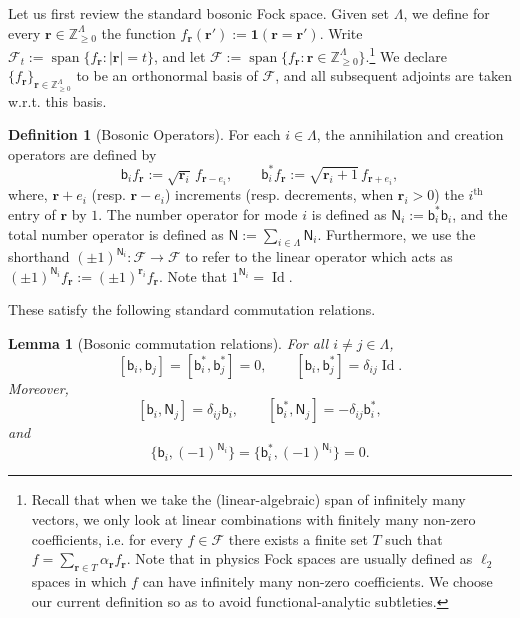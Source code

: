 \documentclass
[11pt,letterpaper]
{article}
\newtheorem{lemma}[theorem]{Lemma}
\theoremstyle{definition}
\newtheorem{definition}[theorem]{Definition}
\newcommand{\sfb}{\mathsf b}
\newcommand{\Num}{\mathsf N}
\newcommand{\cF}{{\mathcal F}}
\newcommand{\1}{\mathbf{1}}
\newcommand{\Z}{\mathbb Z}
\newcommand{\Id}{\operatorname{Id}}
\newcommand{\spn}{\operatorname{span}}
\renewcommand{\geq}{\geqslant}
\begin{document}
Let us first review the standard bosonic Fock space. Given set $\Lambda$, we define for every $\bm{r} \in \Z_{\geq 0}^\Lambda$ the function $f_{\bm{r}}(\bm{r}') := \1(\bm{r} = \bm{r}')$. Write $\cF_t:= \spn\{f_{\bm{r}}:|\bm{r}| = t\}$, and let $\cF := \spn\{f_{\bm{r}}:\bm{r}\in\Z_{\geq 0}^\Lambda \}$.\footnote{Recall that when we take the (linear-algebraic) span of infinitely many vectors, we only look at linear combinations with finitely many non-zero coefficients, i.e. for every $f\in\cF$ there exists a finite set $T$ such that $f = \sum_{\bm{r}\in T}\alpha_{\bm{r}}f_{\bm{r}}$. Note that in physics Fock spaces are usually defined as $\ell_2$ spaces in which $f$ can have infinitely many non-zero coefficients. We choose our current definition so as to avoid functional-analytic subtleties.} We declare $\{f_{\bm r}\}_{\bm r\in\Z_{\geq 0}^\Lambda}$ to be an orthonormal basis of $\cF$, and all subsequent adjoints are taken w.r.t. this basis.
\begin{definition}[Bosonic Operators]\label{def:bosonop}
For each $i\in \Lambda$, the annihilation and creation operators are defined by
\[
\sfb_i f_{\bm{r}}
:=
\sqrt{\bm{r}_i}\,f_{\bm{r}-e_i},
\qquad
\sfb_i^* f_{\bm{r}}
:=
\sqrt{\bm{r}_i+1}\,f_{\bm{r}+e_i},
\]
where, $\bm{r}+e_i$ (resp. $\bm{r}-e_i$) increments (resp. decrements, when $\bm{r}_i>0$) the
$i^{\mathrm{th}}$ entry of $\bm{r}$ by $1$. The number operator for mode $i$ is defined as $\Num_i := \sfb_i^*\sfb_i$, and the total number operator is defined as $\Num := \sum_{i\in\Lambda} \Num_i$. Furthermore, we use the shorthand $(\pm 1)^{\Num_i}:\cF\to\cF$ to refer to the linear operator which acts as $(\pm 1)^{\Num_i}f_{\bm r}:= (\pm 1)^{\bm r_i}f_{\bm r}$. Note that $1^{\Num_i} = \Id$.
\end{definition}

These satisfy the following standard commutation relations. 

\begin{lemma}[Bosonic commutation relations]\label{lem:bosonopcomm}
For all \(i\neq j\in\Lambda\),
\[
[\sfb_i,\sfb_j]=[\sfb_i^*,\sfb_j^*]=0,
\qquad
[\sfb_i,\sfb_j^*]=\delta_{ij}\Id.
\]
Moreover,
\[
[\sfb_i,\Num_j]=\delta_{ij}\sfb_i,
\qquad
[\sfb_i^*,\Num_j]=-\delta_{ij}\sfb_i^*,
\]
and
\[
\{\sfb_i,(-1)^{\Num_i}\}
=
\{\sfb_i^*,(-1)^{\Num_i}\}
=
0.
\]
\end{lemma}
\end{document}
